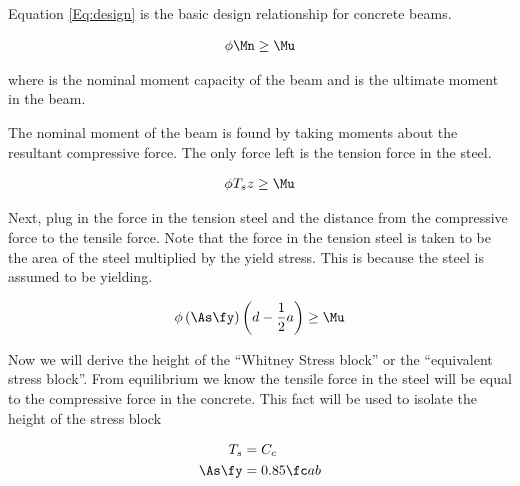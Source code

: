 \begin{figure}[h]
\begin{greenfig}
\end{greenfig}
\end{figure}

Equation \ref{Eq:design} is the basic design relationship for concrete beams.


\begin{align}
	\phi \Mn \geq \Mu
	\label{Eq:design}
\end{align}

where \Mn is the nominal moment capacity of the beam and \Mu is the ultimate moment in the beam.

The nominal moment of the beam is found by taking moments about the resultant compressive force. The only force left is the tension force in the steel.

\begin{align}
	\phi T_s z \geq \Mu
\end{align}

Next, plug in the force in the tension steel and the distance from the compressive force to the tensile force. Note that the force in the tension steel is taken to be the area of the steel multiplied by the yield stress. This is because the steel is assumed to be yielding.

\begin{align}
	\phi
	\left(\As \fy\right)
	\left(d-\frac{1}{2}a\right)
	\geq
	\Mu
	\label{Eq:2}
\end{align}

Now we will derive the height of the ``Whitney Stress block'' or the ``equivalent stress block''. From equilibrium we know the tensile force in the steel will be equal to the compressive force in the concrete. This fact will be used to isolate the height of the stress block

\begin{align}
	T_s &= C_c\\
	\As \fy &= 0.85 \fc ab
\end{align}

